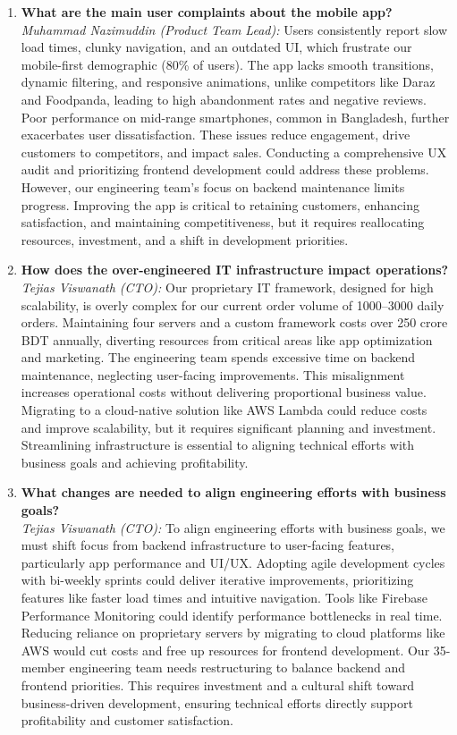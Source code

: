 \documentclass[12pt,a4paper]{article}
\begin{document}
\begin{enumerate}
    \item \textbf{What are the main user complaints about the mobile app?} \\
    \textit{Muhammad Nazimuddin (Product Team Lead):} Users consistently report slow load times, clunky navigation, and an outdated UI, which frustrate our mobile-first demographic (80\% of users). The app lacks smooth transitions, dynamic filtering, and responsive animations, unlike competitors like Daraz and Foodpanda, leading to high abandonment rates and negative reviews. Poor performance on mid-range smartphones, common in Bangladesh, further exacerbates user dissatisfaction. These issues reduce engagement, drive customers to competitors, and impact sales. Conducting a comprehensive UX audit and prioritizing frontend development could address these problems. However, our engineering team’s focus on backend maintenance limits progress. Improving the app is critical to retaining customers, enhancing satisfaction, and maintaining competitiveness, but it requires reallocating resources, investment, and a shift in development priorities.
    
    \item \textbf{How does the over-engineered IT infrastructure impact operations?} \\
    \textit{Tejias Viswanath (CTO):} Our proprietary IT framework, designed for high scalability, is overly complex for our current order volume of 1000–3000 daily orders. Maintaining four servers and a custom framework costs over 250 crore BDT annually, diverting resources from critical areas like app optimization and marketing. The engineering team spends excessive time on backend maintenance, neglecting user-facing improvements. This misalignment increases operational costs without delivering proportional business value. Migrating to a cloud-native solution like AWS Lambda could reduce costs and improve scalability, but it requires significant planning and investment. Streamlining infrastructure is essential to aligning technical efforts with business goals and achieving profitability.
    
    \item \textbf{What changes are needed to align engineering efforts with business goals?} \\
    \textit{Tejias Viswanath (CTO):} To align engineering efforts with business goals, we must shift focus from backend infrastructure to user-facing features, particularly app performance and UI/UX. Adopting agile development cycles with bi-weekly sprints could deliver iterative improvements, prioritizing features like faster load times and intuitive navigation. Tools like Firebase Performance Monitoring could identify performance bottlenecks in real time. Reducing reliance on proprietary servers by migrating to cloud platforms like AWS would cut costs and free up resources for frontend development. Our 35-member engineering team needs restructuring to balance backend and frontend priorities. This requires investment and a cultural shift toward business-driven development, ensuring technical efforts directly support profitability and customer satisfaction.
\end{enumerate}
\end{document}
